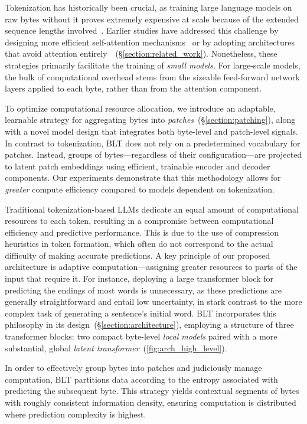 Tokenization has historically been crucial, as training large language models on raw bytes without it proves extremely expensive at scale because of the extended sequence lengths involved~\citep{xue2022byt5}. Earlier studies have addressed this challenge by designing more efficient self-attention mechanisms~\citep{el2020characterbert, clark2022canine} or by adopting architectures that avoid attention entirely~\citep{wang2024mambabyte}~(\S\ref{section:related_work}). Nonetheless, these strategies primarily facilitate the training of \textit{small models}. For large-scale models, the bulk of computational overhead stems from the sizeable feed-forward network layers applied to each byte, rather than from the attention component.

To optimize computational resource allocation, we introduce an adaptable, learnable strategy for aggregating bytes into \textit{patches}~(\S\ref{section:patching}), along with a novel model design that integrates both byte-level and patch-level signals. In contrast to tokenization, {\textsc BLT} does not rely on a predetermined vocabulary for patches. Instead, groups of bytes—regardless of their configuration—are projected to latent patch embeddings using efficient, trainable encoder and decoder components. Our experiments demonstrate that this methodology allows for \textit{greater} compute efficiency compared to models dependent on tokenization.

Traditional tokenization-based LLMs dedicate an equal amount of computational resources to each token, resulting in a compromise between computational efficiency and predictive performance. This is due to the use of compression heuristics in token formation, which often do not correspond to the actual difficulty of making accurate predictions. A key principle of our proposed architecture is adaptive computation—assigning greater resources to parts of the input that require it. For instance, deploying a large transformer block for predicting the endings of most words is unnecessary, as these predictions are generally straightforward and entail low uncertainty, in stark contrast to the more complex task of generating a sentence’s initial word. {\textsc BLT} incorporates this philosophy in its design~(\S\ref{section:architecture}), employing a structure of three transformer blocks: two compact byte-level \textit{local models} paired with a more substantial, global \textit{latent transformer}~(\autoref{fig:arch_high_level}). 

In order to effectively group bytes into patches and judiciously manage computation, {\textsc BLT} partitions data according to the entropy associated with predicting the subsequent byte. This strategy yields contextual segments of bytes with roughly consistent information density, ensuring computation is distributed where prediction complexity is highest.

